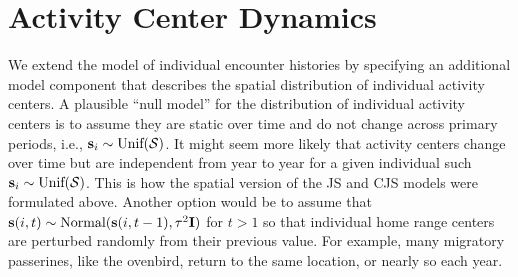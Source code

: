 \section{Activity Center Dynamics}

We extend the model of individual encounter histories by specifying an
additional model component that describes the spatial distribution of
individual activity centers.  A plausible ``null model'' for the
distribution of individual activity centers is to assume they are
static over time and do not change across primary periods,
i.e., ${\bf s}_{i} \sim \mbox{Unif}({\cal S})$.  It might seem more likely
that activity centers change over time but are independent from year to year for a
given individual such ${\bf s}_{i} \sim \mbox{Unif}({\cal S})$.  This is how
the spatial version of the JS and CJS models were formulated above.
Another option would be to assume that ${\bf s}(i,t) \sim \mbox{Normal}({\bf
  s}(i,t-1), \tau^{2} {\bf I})$ for $t > 1$ so that individual home range
centers are perturbed randomly from their previous value. For
example, many migratory passerines, like the ovenbird, return to the
same location, or nearly so each year.  


